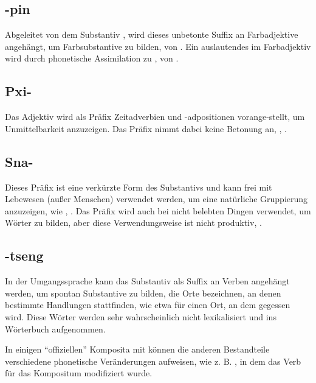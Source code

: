\subsection{-pin} Abgeleitet von dem Substantiv  , wird dieses unbetonte Suffix an Farbadjektive angehängt, um Farbsubstantive zu bilden,   von  . Ein auslautendes  im Farbadjektiv wird durch phonetische Assimilation zu ,  von .

\subsection{Pxi-} Das Adjektiv   wird als Präfix Zeitadverbien und -adpositionen vorange-stellt, um Unmittelbarkeit anzuzeigen. Das Präfix nimmt dabei keine Betonung an,  ,  .

\subsection{Sna-} Dieses Präfix ist eine verkürzte Form des Substantivs   und kann frei mit Lebewesen (außer Menschen) verwendet werden, um eine natürliche Gruppierung anzuzeigen, wie  ,  .
Das Präfix wird auch bei nicht belebten Dingen verwendet, um Wörter zu bilden, aber diese Verwendungsweise ist nicht produktiv,  .

\subsection{-tseng} In der Umgangssprache kann das Substantiv   als Suffix an Verben angehängt werden, um spontan Substantive zu bilden, die Orte bezeichnen, an denen bestimmte Handlungen stattfinden, wie etwa  für einen Ort, an dem gegessen wird. Diese Wörter werden sehr wahrscheinlich nicht lexikalisiert und ins Wörterbuch aufgenommen.

In einigen ``offiziellen'' Komposita mit  können die anderen Bestandteile verschiedene phonetische Veränderungen aufweisen, wie z. B.  , in dem das Verb  für das Kompositum modifiziert wurde.


